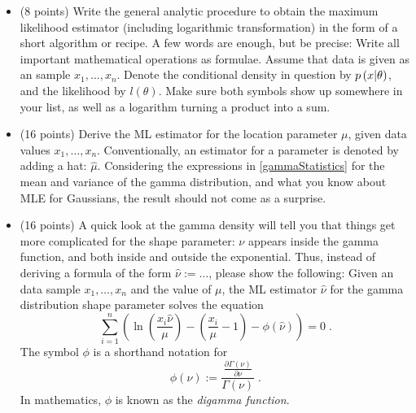 \documentclass[]{../util/ColumbiaAssm}
\begin{document}
\begin{questions}
\begin{itemize}
    \item (8 points)
      Write the general analytic procedure to obtain the
      maximum likelihood estimator (including logarithmic
      transformation) in the form of a short algorithm or 
      recipe. A few words are enough, but be precise: Write all important
      mathematical operations as formulae. Assume that data is given
      as an \iid sample $x_1,\dots,x_n$. Denote the conditional
      density in question by $p\left( x | \theta  \right)$, and the
      likelihood by $l\left( \theta \right)$. Make sure both symbols
      show up somewhere in your list, as well as a logarithm turning 
      a product into a sum.
    \item (16 points)
      Derive the ML estimator for the location parameter
      $\mu$, given data values $x_1,\dots,x_n$. 
      Conventionally, an estimator for a parameter is
      denoted by adding a hat: $\hat{\mu}$.
      Considering the expressions in \eqref{gammaStatistics} for the 
      mean and variance of the gamma distribution, and what you
      know about MLE for Gaussians, the result should not come as a surprise.
    \item (16 points)
      A quick look at the gamma density will tell you that things get
      more complicated for the shape parameter: $\nu$ 
      appears inside the gamma function, and both inside and outside
      the exponential.
      Thus, instead of deriving a formula of the form
      $\hat{\nu}:=\dots$, please show the following:
      Given an \iid data sample $x_1,\dots,x_n$ and the value of
      $\mu$, the ML estimator $\hat{\nu}$ for the gamma distribution shape
      parameter solves the equation
      \begin{equation*}
	\label{nuTranscendentalEquation}
	\sum_{i=1}^{n}\left(
	\ln \left( \frac{x_i \hat{\nu}}{\mu} \right) - \left( \frac{x_i}{\mu} -
	1 \right) - 
	\phi\left( \hat{\nu} \right)
	\right) = 0 \; .
      \end{equation*}
      The symbol $\phi$ is a shorthand notation for 
      \begin{equation*}
	\phi\left( \nu \right) := \frac{\frac{\partial\Gamma\left(
	    \nu\right)}{\partial \nu}}{\Gamma\left( \nu \right)} \; .
      \end{equation*}
      In mathematics, $\phi$
      is known as the {\em digamma function}.
    \end{itemize}



\end{questions}
\end{document}

